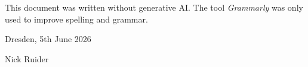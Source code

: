 \chapter*{\Large \confirmationname}
\thispagestyle{empty}

\confirmationtext
This document was written without generative AI. The tool \textit{Grammarly} was only used to improve spelling and grammar.

Dresden, 5th June 2026

\vspace{15mm}

Nick Ruider
